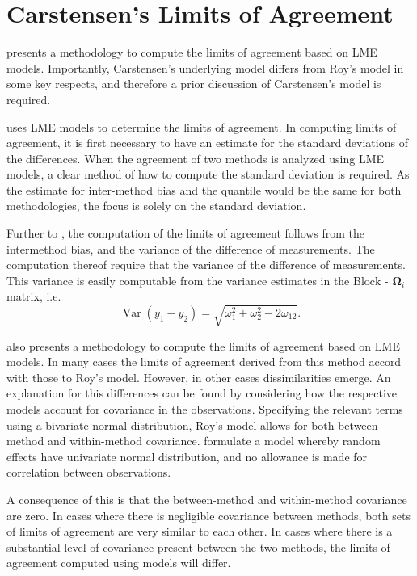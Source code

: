 \documentclass[12pt, a4paper]{report}
\theoremstyle{plain}
\theoremstyle{definition}
\theoremstyle{remark}
\begin{document}
\newpage
	\section{Carstensen's Limits of Agreement}
	\citet{bxc2008} presents a methodology to compute the limits of
	agreement based on LME models. Importantly, Carstensen's underlying model differs from Roy's model in some key respects, and therefore a prior discussion of Carstensen's model is required.
	

	\citet{BXC2008} uses LME models to determine the limits of agreement.  In computing limits of agreement, it is first necessary to have an estimate for the standard deviations of the differences. When the agreement of two methods is analyzed using LME models, a clear method of how to compute the standard deviation is required. As the estimate for inter-method bias and the quantile would be the same for both methodologies, the focus is solely on the standard deviation.
	
Further to \citet{BA86}, the computation of the limits of agreement follows from the intermethod bias, and the variance of the difference of measurements. 	The computation thereof require that the variance of the difference of measurements. This variance is easily computable from the  variance estimates in the ${\mbox{Block - }\boldsymbol \Omega_{i}}$ matrix, i.e.
\[
\operatorname{Var}(y_1 - y_2) = \sqrt{ \omega^2_1 + \omega^2_2 - 2\omega_{12}}.
\]
	
	\citet{BXC2008} also presents a methodology to compute the limits of agreement based on LME models. In many cases the limits of agreement derived from this method accord with those to Roy's model. However, in other cases dissimilarities emerge. An explanation for this differences can be found by considering how the respective models account for covariance in the observations. Specifying the relevant terms using a bivariate normal distribution, Roy's model allows for both between-method and within-method covariance. \citet{BXC2008} formulate a model whereby random effects have univariate normal distribution, and no allowance is made for correlation between observations.
	
	A consequence of this is that the between-method and within-method covariance are zero. In cases where there is negligible covariance between methods, both sets of limits of agreement are very similar to each other. In cases where there is a substantial level of covariance present between the two methods, the limits of agreement computed using models will differ.
	
\end{document}
